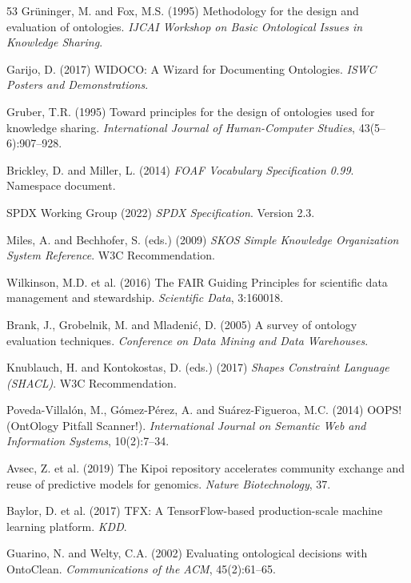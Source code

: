 \documentclass[Afour,sagev,times]{sagej}
\begin{document}
\begin{thebibliography}{53}
 Gr\"uninger, M. and Fox, M.S. (1995) Methodology for the design and evaluation of ontologies. \emph{IJCAI Workshop on Basic Ontological Issues in Knowledge Sharing}.

 Garijo, D. (2017) WIDOCO: A Wizard for Documenting Ontologies. \emph{ISWC Posters and Demonstrations}.

 Gruber, T.R. (1995) Toward principles for the design of ontologies used for knowledge sharing. \emph{International Journal of Human-Computer Studies}, 43(5--6):907--928.

 Brickley, D. and Miller, L. (2014) \emph{FOAF Vocabulary Specification 0.99}. Namespace document.

 SPDX Working Group (2022) \emph{SPDX Specification}. Version 2.3.

 Miles, A. and Bechhofer, S. (eds.) (2009) \emph{SKOS Simple Knowledge Organization System Reference}. W3C Recommendation.

 Wilkinson, M.D. et al. (2016) The FAIR Guiding Principles for scientific data management and stewardship. \emph{Scientific Data}, 3:160018.

 Brank, J., Grobelnik, M. and Mladeni\'c, D. (2005) A survey of ontology evaluation techniques. \emph{Conference on Data Mining and Data Warehouses}.

 Knublauch, H. and Kontokostas, D. (eds.) (2017) \emph{Shapes Constraint Language (SHACL)}. W3C Recommendation.

 Poveda-Villal\'on, M., G\'omez-P\'erez, A. and Su\'arez-Figueroa, M.C. (2014) OOPS! (OntOlogy Pitfall Scanner!). \emph{International Journal on Semantic Web and Information Systems}, 10(2):7--34.

 Avsec, Z. et al. (2019) The Kipoi repository accelerates community exchange and reuse of predictive models for genomics. \emph{Nature Biotechnology}, 37.

 Baylor, D. et al. (2017) TFX: A TensorFlow-based production-scale machine learning platform. \emph{KDD}.

 Guarino, N. and Welty, C.A. (2002) Evaluating ontological decisions with OntoClean. \emph{Communications of the ACM}, 45(2):61--65.

\end{thebibliography}

\appendix
\end{document}
